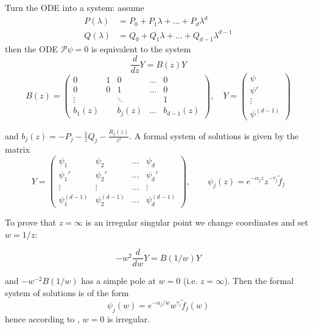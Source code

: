 \documentclass{article}
\theoremstyle{definition}
\theoremstyle{plain}
\newenvironment{verify}{\color{ForestGreen}}{\color{black}}
\begin{document}
\begin{verify}
    Turn the ODE into a system: assume 
    \begin{align*}
P(\lambda) & = P_0 + P_1 \lambda + \ldots + P_d \lambda^d \\
Q(\lambda) & = Q_0 + Q_1 \lambda + \ldots + Q_{d-1} \lambda^{d-1}
\end{align*}
then the ODE $\mathcal{P}\psi=0$ is equivalent to the system 
    \begin{equation}
        \frac{d}{dz}Y= B(z) Y 
    \end{equation}
    \[
    B(z)=\begin{pmatrix}
            0 & 1 & 0 & \ldots & 0 \\
            0 & 0 & 1 & \ldots & 0 \\
            \vdots & &\ddots & & 1\\
            b_{1}(z) & & b_j(z) & \ldots & b_{d-1}(z)
        \end{pmatrix}, \quad Y=\begin{pmatrix}
            \psi \\
            \psi ' \\
            \vdots \\
            \psi^{(d-1)}
        \end{pmatrix}
    \]
    
 and $b_j(z)=-P_j-\frac{1}{z}Q_j-\frac{R_j(z)}{z^2}$. A formal system of solutions is given by the matrix 
\begin{equation}
    Y=\begin{pmatrix}
       \psi_1 & \psi_2 & \ldots & \psi_d  \\
       \psi_1' & \psi_2' & \ldots & \psi_d'  \\
       \vdots & \vdots  & \ldots & \vdots  \\
       \psi_1^{(d-1)} & \psi_2^{(d-1)} & \ldots & \psi_d^{(d-1)} 
    \end{pmatrix}, \qquad \psi_j(z)=e^{-\alpha_j z}z^{-\tau_j}\tilde{f}_j
\end{equation} 

To prove that $z=\infty$ is an irregular singular point we change coordinates and set $w=1/z$:  

 \begin{equation}
        -w^2 \frac{d}{dw}Y= B(1/w) Y 
    \end{equation}

and $-w^{-2}B(1/w)$ has a simple pole at $w=0$ (i.e. $z=\infty$). Then the formal system of solutions is of the form 
\[\psi_j(w)=e^{-\alpha_j/w} w^{\tau_j} \tilde{f}_j(w)\]
hence according to \cite[Definition 3.3.2]{diverg-resurg--ii}, $w=0$ is irregular. 
\end{verify}
\end{document}
